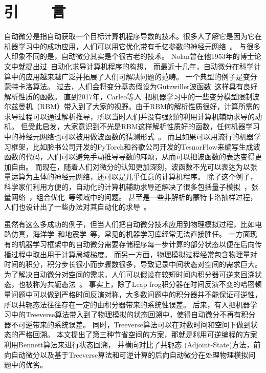 \documentclass[A4,twoside,fontset=ubuntu,UTF8]{ctexart}
\begin{document}
\section{引~~~~言}
    自动微分是指自动获取一个目标计算机程序导数的技术。很多人了解它是因为它在机器学习中的成功应用，人们可以用它优化带有千亿参数的神经元网络~\cite{Rosset2019}。
与很多人印象不同的是，自动微分其实是个很古老的技术。
Nolan曾在他1953年的博士论文中就提出过~\cite{Nolan1953}自动化求导计算机程序的构想，
而最近十几年，自动微分在科学计算中的应用越来越广泛并拓展了人们可解决问题的范畴。
    一个典型的例子是变分蒙特卡洛算法。
过去，人们会将变分基态假设为Gutzwiller波函数~\cite{Gutzwiller1963}这样具有良好解析性质的函数。
直到2017年，Carleo等人~\cite{Carleo2017, Deng2017}把机器学习中的一些变分模型限制波尔兹曼机（RBM）带入到了大家的视野。由于RBM的解析性质很好，计算所需的求导过程可以通过解析推导，所以当时人们并没有强烈的利用计算机辅助求导的动机。
但受此启发，大家意识到不光是RBM这样解析性质好的函数，任何机器学习中的神经元网络也可以被用做波函数的猜测形式~\cite{Cai2018}。
而且如果可以用流行的机器学习框架，比如脸书公司开发的PyTorch和谷歌公司开发的TesnorFlow来编写生成波函数的代码，人们可以避免手动推导导数的麻烦，从而可以把波函数的表达变得更加自由。
而现在，随着人们对微分的认知更加深刻，波函数不光可以表达为以张量运算为主体的神经元网络，还可以是几乎任意的计算机程序。
    除了这个例子，科学家们利用方便的，自动化的计算机辅助求导还解决了很多包括量子模拟~\cite{Luo2019}，张量网络~\cite{Liao2019}，组合优化~\cite{Liu2020}等领域中的问题。
甚至是一些非解析的蒙特卡洛抽样过程，人们也设计出了一些办法对其自动化的求导~\cite{Zhang2019}。

虽然有这么多成功的例子，但当人们把自动微分技术应用到物理模拟过程，比如电路仿真，海洋学~\cite{Heimbach2005}和地震学~\cite{Symes2007,Zhu2020}等，常见的机器学习库经常无法直接胜任。
一方面现有的机器学习框架中的自动微分需要存储程序每一步计算的部分状态以便在后向传播过程中取出用于计算局域梯度。
而另一方面，物理模拟过程经常包含物理量对时间的积分，积分步长很小而步骤数很多，导致记录中间状态对空间的需求巨大。
为了解决自动微分对空间的需求，人们可以假设在较短时间内积分器可逆来回溯状态，也被称为共轭态法~\cite{Plessix2006,Chen2018}。
事实上，除了Leap frog积分器在时间反演不变的哈密顿量问题中可以做到严格时间反演对称，大多数问题中的积分器并不能保证可逆性，所以共轭态法往往存在一定的由积分器带来的系统性误差。
后来，有人把机器学习中的Treeverse算法带入到了物理模拟的状态回溯中，使得自动微分不再有积分器不可逆带来的系统误差。
同时，Treeverse算法可以在对数时间和空间下做到状态的严格回溯。
本文提出了第三种节省空间的方案，那就是利用可逆编程的方案利用Bennett算法来进行状态回溯，
并横向对比了共轭态 (Adjoint-State)方法，前向自动微分以及基于Treeverse算法和可逆计算的后向自动微分在处理物理模拟问题中的优劣。
\end{document}
